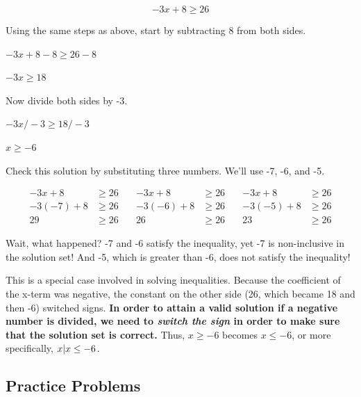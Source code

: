 $$-3x + 8 \geq 26$$



Using the same steps as above, start by subtracting 8 from both sides.



$-3x + 8 - 8 \ge 26 - 8$



$-3x \ge 18$



Now divide both sides by -3.



$-3x/-3 \ge 18/-3$



$x \ge -6$



Check this solution by substituting three numbers. We'll use -7, -6, and -5.


\[
\begin{aligned}
-3x + 8 &\ge 26 \quad & -3x + 8 &\ge 26 \quad & -3x + 8 &\ge 26 \\
-3(-7) + 8 &\ge 26 \quad & -3(-6) + 8 &\ge 26 \quad & -3(-5) + 8 &\ge 26 \\
29 &\ge 26 \quad & 26 &\ge 26 \quad & 23 &\ge 26
\end{aligned}
\]


Wait, what happened? -7 and -6 satisfy the inequality, yet -7 is non-inclusive in the
solution set! And -5, which is greater than -6, does not satisfy the inequality!



This is a special case involved in solving inequalities. Because the coefficient of the
x-term was negative, the constant on the other side (26, which became 18 and then -6)
switched signs. \textbf{In order to attain a valid solution if a negative number is
divided, we need to \textit{switch the sign} in order to make sure that the solution set
is correct.} Thus, $x \ge -6$ becomes $x \le -6$, or more specifically, $\\{x | x \le
-6\\}$.






\subsection{Practice Problems}
\label{sss:prac-fe87}





